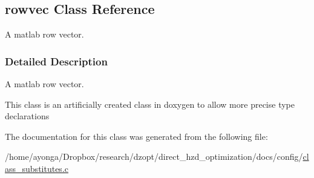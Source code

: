 \hypertarget{classrowvec}{}\subsection{rowvec Class Reference}
\label{classrowvec}


A matlab row vector.  




\subsubsection{Detailed Description}
A matlab row vector. 

This class is an artificially created class in doxygen to allow more precise type declarations 

The documentation for this class was generated from the following file\+:\begin{DoxyCompactItemize}
\item 
/home/ayonga/\+Dropbox/research/dzopt/direct\+\_\+hzd\+\_\+optimization/docs/config/\hyperlink{class__substitutes_8c}{class\+\_\+substitutes.\+c}\end{DoxyCompactItemize}
